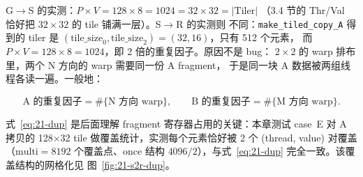 G$\to$S 的实测：$P\times V = 128\times 8 = 1024 = 32\times 32 = |\mathrm{Tiler}|$
（3.4 节的 Thr/Val 恰好把 $32\times32$ 的 tile 铺满一层）。S$\to$R 的实测则
不同：\texttt{make\_\allowbreak{}tiled\_\allowbreak{}copy\_\allowbreak{}A} 得到的 tiler 是
$(\mathrm{tile\_size}_0, \mathrm{tile\_size}_2) = (32,16)$，只有 512 个元素，
而 $P\times V = 128\times 8 = 1024$，即 2 倍的重复因子。原因不是 bug：
$2\times2$ 的 warp 排布里，两个 N 方向的 warp 需要同一份 A fragment，
于是同一块 A 数据被两组线程各读一遍。一般地：

\begin{equation}
  \text{A 的重复因子} = \#\{\text{N 方向 warp}\},\qquad
  \text{B 的重复因子} = \#\{\text{M 方向 warp}\} .
  \label{eq:21-dup}
\end{equation}

式~\eqref{eq:21-dup} 是后面理解 fragment 寄存器占用的关键：本章测试 case~E
对 A 拷贝的 128$\times$32 tile 做覆盖统计，实测每个元素恰好被 2 个
(thread, value) 对覆盖（$\mathrm{multi}=8192$ 个覆盖点、$\mathrm{once}$ 结构
$4096/2$），与式~\eqref{eq:21-dup} 完全一致。该覆盖结构的网格化见
图~\ref{fig:21-s2r-dup}。

